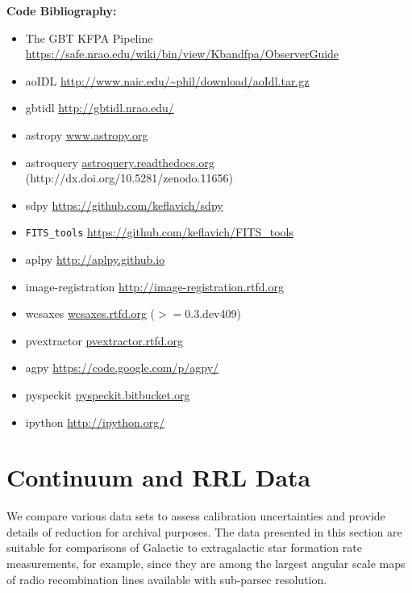 \textbf{Code Bibliography:} 
\begin{itemize}
    \item The GBT KFPA Pipeline \url{https://safe.nrao.edu/wiki/bin/view/Kbandfpa/ObserverGuide}
    \item aoIDL \url{http://www.naic.edu/~phil/download/aoIdl.tar.gz}
    \item gbtidl \url{http://gbtidl.nrao.edu/}
    \item astropy \url{www.astropy.org} \citep{Astropy-Collaboration2013a}
    \item astroquery \url{astroquery.readthedocs.org} (http://dx.doi.org/10.5281/zenodo.11656)
    \item sdpy \url{https://github.com/keflavich/sdpy}
    \item \texttt{FITS\_tools} \url{https://github.com/keflavich/FITS_tools}
    \item aplpy \url{http://aplpy.github.io}
    \item image-registration \url{http://image-registration.rtfd.org}
    \item wcsaxes \url{wcsaxes.rtfd.org} ($>=$0.3.dev409)
    \item pvextractor \url{pvextractor.rtfd.org}
    \item agpy \url{https://code.google.com/p/agpy/}
    \item pyspeckit \url{pyspeckit.bitbucket.org} \citep{Ginsburg2011c}
    \item ipython \url{http://ipython.org/} \citep{Perez2007a}
\end{itemize}

\clearpage
\appendix
\section{Continuum and RRL Data}
\label{sec:contrrldata}
We compare various data sets to assess calibration uncertainties and
provide details of reduction for archival purposes.  The data presented in this
section are suitable for comparisons of Galactic to extragalactic star
formation rate measurements, for example, since they are among the largest
angular scale maps of radio recombination lines available with sub-parsec
resolution.

